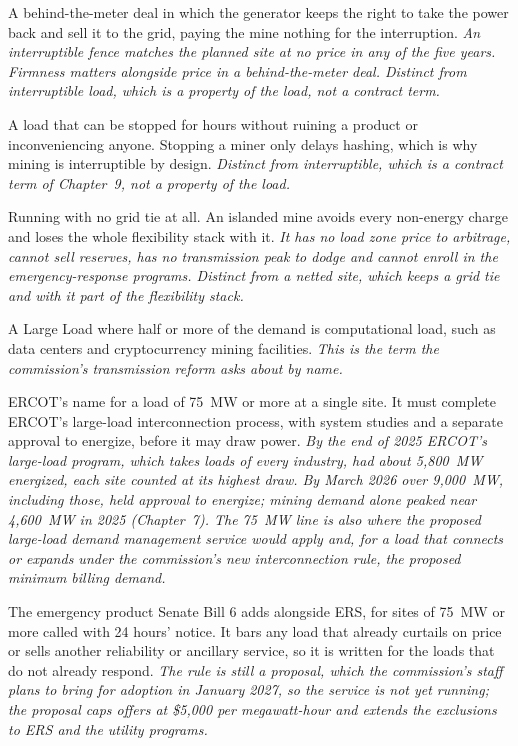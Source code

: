 \begin{description}[leftmargin=0pt,style=unboxed,itemsep=0.35em,parsep=0.15em]
\item[interruptible] \hypertarget{glossary:interruptible}{}A behind-the-meter deal in which the generator keeps the right to take the power back and sell it to the grid, paying the mine nothing for the interruption. \emph{An interruptible fence matches the planned site at no price in any of the five years. Firmness matters alongside price in a behind-the-meter deal. Distinct from interruptible load, which is a property of the load, not a contract term.}
\item[interruptible load] \hypertarget{glossary:interruptible-load}{}A load that can be stopped for hours without ruining a product or inconveniencing anyone. Stopping a miner only delays hashing, which is why mining is interruptible by design. \emph{Distinct from interruptible, which is a contract term of Chapter~9, not a property of the load.}
\item[islanded] \hypertarget{glossary:islanded}{}Running with no grid tie at all. An islanded mine avoids every non-energy charge and loses the whole flexibility stack with it. \emph{It has no load zone price to arbitrage, cannot sell reserves, has no transmission peak to dodge and cannot enroll in the emergency-response programs. Distinct from a netted site, which keeps a grid tie and with it part of the flexibility stack.}
\item[Large Computational Load] \hypertarget{glossary:large-computational-load}{}A Large Load where half or more of the demand is computational load, such as data centers and cryptocurrency mining facilities. \emph{This is the term the commission's transmission reform asks about by name.}
\item[Large Load] \hypertarget{glossary:large-load}{}ERCOT's name for a load of 75~MW or more at a single site. It must complete ERCOT's large-load interconnection process, with system studies and a separate approval to energize, before it may draw power. \emph{By the end of 2025 ERCOT's large-load program, which takes loads of every industry, had about 5,800~MW energized, each site counted at its highest draw. By March 2026 over 9,000~MW, including those, held approval to energize; mining demand alone peaked near 4,600~MW in 2025 (Chapter~7). The 75~MW line is also where the proposed large-load demand management service would apply and, for a load that connects or expands under the commission's new interconnection rule, the proposed minimum billing demand.}
\item[large-load demand management service] \hypertarget{glossary:large-load-demand-management-service}{}The emergency product Senate Bill 6 adds alongside ERS, for sites of 75~MW or more called with 24 hours' notice. It bars any load that already curtails on price or sells another reliability or ancillary service, so it is written for the loads that do not already respond. \emph{The rule is still a proposal, which the commission's staff plans to bring for adoption in January 2027, so the service is not yet running; the proposal caps offers at \$5,000 per megawatt-hour and extends the exclusions to ERS and the utility programs.}

\end{description}
